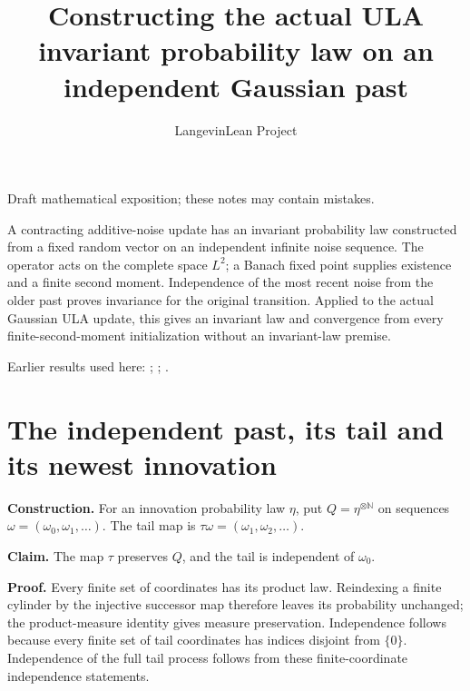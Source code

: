 \documentclass[11pt,a4paper]{article}
\title{\texorpdfstring{Constructing the actual ULA invariant probability law on an independent Gaussian past}{Constructing the actual ULA invariant probability law on an independent Gaussian past}}
\author{LangevinLean Project}
\date{}
\begin{document}
\maketitle
Draft mathematical exposition; these notes may contain mistakes.


A contracting additive-noise update has an invariant probability law constructed from a fixed random vector on an independent infinite noise sequence. The operator acts on the complete space \(L^2\); a Banach fixed point supplies existence and a finite second moment. Independence of the most recent noise from the older past proves invariance for the original transition. Applied to the actual Gaussian ULA update, this gives an invariant law and convergence from every finite-second-moment initialization without an invariant-law premise.



Earlier results used here: \cite[Section~3.13]{LangevinLean2026ULASC}; \cite[Section~3.36]{LangevinLean2026ULASC}; \cite[Section~3.21]{LangevinLean2026ULASC}.

\section{\texorpdfstring{The independent past, its tail and its newest innovation}{The independent past, its tail and its newest innovation}}


\textbf{Construction.} For an innovation probability law \(\eta\), put \(Q=\eta^{\otimes\mathbb N}\) on sequences \(\omega=(\omega_0,\omega_1,\ldots)\). The tail map is \(\tau\omega=(\omega_1,\omega_2,\ldots)\).




\textbf{Claim.} The map \(\tau\) preserves \(Q\), and the tail is independent of \(\omega_0\).




\textbf{Proof.} Every finite set of coordinates has its product law. Reindexing a finite cylinder by the injective successor map therefore leaves its probability unchanged; the product-measure identity gives measure preservation. Independence follows because every finite set of tail coordinates has indices disjoint from \(\{0\}\). Independence of the full tail process follows from these finite-coordinate independence statements.
\end{document}
